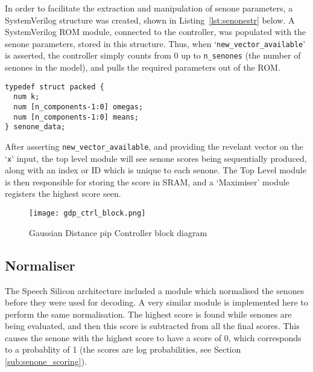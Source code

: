 		In order to facilitate the extraction and manipulation of senone parameters, a SystemVerilog structure was created, shown in Listing~\ref{lst:senonestr} below. A SystemVerilog ROM module, connected to the controller, was populated with the senone parameters, stored in this structure.  Thus, when `\texttt{new\_vector\_available}' is asserted, the controller simply counts from 0 up to \texttt{n\_senones} (the number of senones in the model), and pulls the required parameters out of the ROM.

\begin{lstlisting}[style=customc, label=lst:senonestr, caption=Senone parameter data structure]
typedef struct packed {
  num k;
  num [n_components-1:0] omegas;
  num [n_components-1:0] means;
} senone_data;
\end{lstlisting}

		After asserting \texttt{new\_vector\_available}, and providing the revelant vector on the `\texttt{x}' input, the top level module will see  senone scores being sequentially produced, along with an index or ID which is unique to each senone.  The Top Level module is then responsible for storing the score in SRAM, and a `Maximiser' module registers the highest score seen.
		\begin{figure}[tb]
			\begin{center}
				\texttt{[image: gdp\_ctrl\_block.png]}
			\end{center}
			\caption{Gaussian Distance pip Controller block diagram}
			\label{fig:gdp_ctrl_block}
		\end{figure}

	\subsection{Normaliser} %
	\label{sub:normaliser}
		The Speech Silicon architecture included a module which normalised the senones before they were used for decoding.  A very similar module is implemented here to perform the same normalisation.  The highest score is found while senones are being evaluated, and then this score is subtracted from all the final scores.  This causes the senone with the highest score to have a score of 0, which corresponds to a probablity of 1 (the scores are log probabilities, see Section \ref{sub:senone_scoring}).

